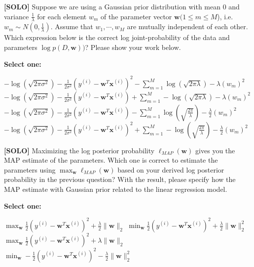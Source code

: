 \documentclass[11pt,addpoints,answers]{exam}
\newcommand{\solo}{\textbf{[SOLO]} }
\begin{document}
\begin{questions}
    
    \question[3]\solo Suppose we are using a Gaussian prior distribution with mean 0 and variance $\frac{1}{\lambda}$ for each element $w_m$  of the parameter vector $\mathbf{w} (1 \leq m \leq M $), i.e. $w_m \sim N(0, \frac{1}{\lambda})$. Assume that $w_1, \cdots, w_M$ are mutually independent of each other. Which expression below is the correct log joint-probability of the data and parameters $\log p(D, \mathbf{w}))$?  Please show your work below.


    \textbf{Select one:}
    \begin{checkboxes}
        \choice $-\log (\sqrt{2\pi\sigma^2}) - \frac{1}{2\sigma^2} (y^{(i)} - \mathbf{w}^T\mathbf{x}^{(i)})^2 - \sum_{m=1}^M \log(\sqrt{2\pi\lambda}) - \lambda (w_m)^2$
        \choice $-\log (\sqrt{2\pi\sigma^2}) - \frac{1}{2\sigma^2} (y^{(i)} - \mathbf{w}^T\mathbf{x}^{(i)}) + \sum_{m=1}^M -\log(\sqrt{2\pi\lambda}) - \lambda (w_m)^2$
        \choice $-\log (\sqrt{2\pi\sigma^2}) - \frac{1}{2\sigma^2} (y^{(i)} - \mathbf{w}^T\mathbf{x}^{(i)}) -  \sum_{m=1}^M \log(\sqrt{\frac{2\pi}{\lambda}}) - \frac{\lambda}{2}(w_m)^2$
        \choice $-\log (\sqrt{2\pi\sigma^2}) - \frac{1}{2\sigma^2} (y^{(i)} - \mathbf{w}^T\mathbf{x}^{(i)})^2 +  \sum_{m=1}^M -\log(\sqrt{\frac{2\pi}{\lambda}}) - \frac{\lambda}{2}(w_m)^2$
    \end{checkboxes}
    
    
        
    
    \question[3]\solo Maximizing the log posterior probability  $\ell_{\textit{MAP}}(\mathbf{w})$ gives you the MAP estimate of the parameters. Which one is correct to estimate the parameters using $\max_{\mathbf{w}} \ell_{\textit{MAP}}(\mathbf{w})$ based on your derived log posterior probability in the previous question?  With the result, please specify how the MAP estimate with Gaussian prior related to the linear regression model.
    

    \textbf{Select one:}
    \begin{checkboxes}
        \choice $\max_{\mathbf{w}} \frac{1}{2} (y^{(i)} - \mathbf{w}^T\mathbf{x}^{(i)})^2 + \frac{\lambda}{2}\|\mathbf{w}\|_2$
        \choice $\min_{\mathbf{w}} \frac{1}{2} (y^{(i)} - \mathbf{w}^T\mathbf{x}^{(i)})^2 + \frac{\lambda}{2}\|\mathbf{w}\|_2^2$
        \choice $\max_{\mathbf{w}} \frac{1}{2} (y^{(i)} - \mathbf{w}^T\mathbf{x}^{(i)})^2 + \lambda\|\mathbf{w}\|_2$
        \choice $\min_{\mathbf{w}} - \frac{1}{2} (y^{(i)} - \mathbf{w}^T\mathbf{x}^{(i)})^2 - \frac{\lambda}{2}\|\mathbf{w}\|_2^2$
    \end{checkboxes}
    

\end{questions}
\end{document}
